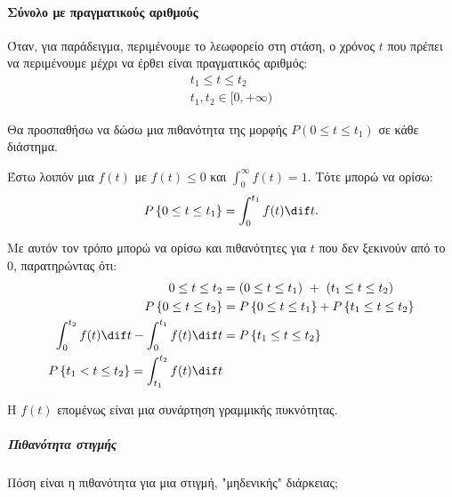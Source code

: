 \documentclass[11pt,a4paper,notitlepage,fleqn,final]{article}
\begin{document}
	\paragraph{Σύνολο με πραγματικούς αριθμούς}
	Όταν, για παράδειγμα, περιμένουμε το λεωφορείο στη στάση, ο χρόνος
	\( t \) που πρέπει να περιμένουμε μέχρι να έρθει είναι πραγματικός
	αριθμός:
	\begin{gather*}
		t_1 \leq t \leq t_2 \\ t_1,t_2 \in [0,+\infty)
	\end{gather*}

	Θα προσπαθήσω να δώσω μια πιθανότητα της μορφής
	\( P(0 \leq t \leq t_1) \)
	σε κάθε διάστημα.

	Έστω λοιπόν μια \underline{\( f(t) \)} με \( f(t) \leq 0 \) και
	\( \displaystyle \int_0^\infty f(t) = 1 \). Τότε μπορώ να ορίσω:
	\[
	P\left\lbrace 0 \leq t \leq t_1 \right\rbrace =
	\int_0^{t_1} f(t)\dif t.
	\]

	Με αυτόν τον τρόπο μπορώ να ορίσω και πιθανότητες για \( t \) που
	δεν ξεκινούν από το 0, παρατηρώντας ότι:
	\begin{align*}
	0 \leq t \leq t_2 &= \left(0 \leq t \leq t_1\right) \ + \ \left(t_1\leq t \leq t_2\right) \\
	P\left\lbrace 0\leq t \leq t_2 \right\rbrace &=
	P\left\lbrace 0 \leq t \leq t_1 \right\rbrace + P\left\lbrace
	t_1 \leq t \leq t_2 \right\rbrace \\
	\int_0^{t_2} f(t)\dif t - \int_0^{t_1} f(t)\dif t &=
	P\left\lbrace t_1 \leq t \leq t_2 \right\rbrace \\
	P\left\lbrace t_1<t\leq t_2 \right\rbrace =
	\int_{t_1}^{t_2} f(t)\dif t
	\end{align*}


	Η \( f(t) \) επομένως είναι μια συνάρτηση γραμμικής πυκνότητας.

	\subparagraph{Πιθανότητα στιγμής}
	Πόση είναι η πιθανότητα για μια στιγμή, "μηδενικής" διάρκειας;
\end{document}

